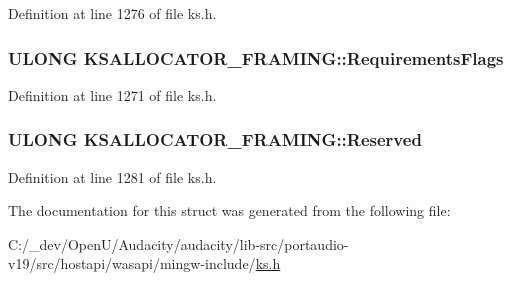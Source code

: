 Definition at line 1276 of file ks.\+h.

\subsubsection[{\texorpdfstring{Requirements\+Flags}{RequirementsFlags}}]{\setlength{\rightskip}{0pt plus 5cm}U\+L\+O\+NG K\+S\+A\+L\+L\+O\+C\+A\+T\+O\+R\+\_\+\+F\+R\+A\+M\+I\+N\+G\+::\+Requirements\+Flags}\hypertarget{struct_k_s_a_l_l_o_c_a_t_o_r___f_r_a_m_i_n_g_a171535e1d4022c72ca0a857efac094d6}{}\label{struct_k_s_a_l_l_o_c_a_t_o_r___f_r_a_m_i_n_g_a171535e1d4022c72ca0a857efac094d6}


Definition at line 1271 of file ks.\+h.

\subsubsection[{\texorpdfstring{Reserved}{Reserved}}]{\setlength{\rightskip}{0pt plus 5cm}U\+L\+O\+NG K\+S\+A\+L\+L\+O\+C\+A\+T\+O\+R\+\_\+\+F\+R\+A\+M\+I\+N\+G\+::\+Reserved}\hypertarget{struct_k_s_a_l_l_o_c_a_t_o_r___f_r_a_m_i_n_g_a55979a49c3e1b4e3cd5936a1b51e056e}{}\label{struct_k_s_a_l_l_o_c_a_t_o_r___f_r_a_m_i_n_g_a55979a49c3e1b4e3cd5936a1b51e056e}


Definition at line 1281 of file ks.\+h.



The documentation for this struct was generated from the following file\+:\begin{DoxyCompactItemize}
\item 
C\+:/\+\_\+dev/\+Open\+U/\+Audacity/audacity/lib-\/src/portaudio-\/v19/src/hostapi/wasapi/mingw-\/include/\hyperlink{ks_8h}{ks.\+h}\end{DoxyCompactItemize}

